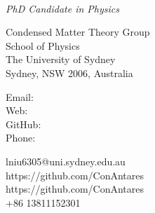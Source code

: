 \documentclass[12pt,a4paper,utf8]{report}
\newcommand{\namefont}[1]{{\normalfont\bfseries\Huge{#1}}}
\newcommand{\myname}{Lu Niu}
\newcommand{\mydegree}{PhD Candidate in Physics}
\newcommand{\mywork}{\quad}%
\begin{document}
\begin{minipage}[t]{8cm}
    \begin{center}
        \vspace{0.0cm}\namefont{\myname}\\[0.1cm]
    \end{center}
\end{minipage}
\begin{minipage}[t]{8cm}
    \vspace{0.0cm}
    {\em{\mydegree}}\par
    {\em{\mywork}}\par
\end{minipage}

\begin{minipage}[t]{8cm}
    \vspace{0.4cm}
    Condensed Matter Theory Group \\
    School of Physics \\
    The University of Sydney \\
    Sydney, NSW 2006, Australia\\
\end{minipage}
\begin{minipage}[t]{1.5cm}
    \vspace{0.4cm}
    Email: \\
    Web: \\
    GitHub: \\
    Phone: \\
\end{minipage}
\begin{minipage}[t]{8cm}
    \vspace{0.4cm}
    lniu6305@uni.sydney.edu.au \\
    https://github.com/ConAntares \\
    https://github.com/ConAntares \\
    +86 13811152301\\
\end{minipage}
\vspace{-0.2cm}
\end{document}
